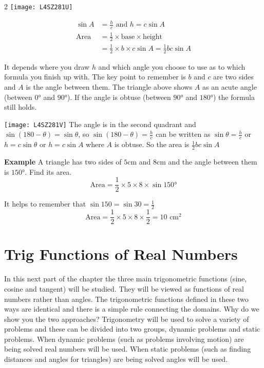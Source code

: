 \columnsep =30pt
\begin {multicols}{2} 
\texttt{[image: L4SZ281U]}

\begin{align*}\sin  A &  = \frac{h}{c}\text{ and }h =c \sin  A \\
\text{Area} &  =  \frac{1}{2} \times \text{base} \times \text{height} \\
 &  =  \frac{1}{2} \times b \times c \sin  A =\frac{1}{2} b c \sin  A
 \end{align*}
\end {multicols}
It depends where you draw $h$ and which angle you choose to use as to which formula you finish up with. The key point to remember is $b$ and $c$ are two sides and $A$ is the angle between them. The triangle above shows $A$ as an acute angle (between $\ang{0}$ and $\ang{90} $). If the angle is obtuse (between $\ang{90} $ and $\ang{180} $) the formula still holds. 
\begin{multicols}{2}
\texttt{[image: L4SZ281V]}
The angle is in the second quadrant and $\sin  (180 -\theta ) =\sin  \theta $, so $\sin  (180 -\theta ) =\frac{h}{c}$ can be written as $\sin  \theta  =\frac{h}{c}$ or $h =c \sin  \theta $ or $h =c \sin  A$ where $A$ is obtuse. So the area is $\frac{1}{2} b c \sin  A$ 
\end{multicols}
\textbf{Example} A triangle has two sides of $5 \mbox{cm}$ and $8 \mbox{cm}$ and the angle between them is $\ang{150} $. Find its area.
\begin{equation*}\text{Area} =\frac{1}{2} \times 5 \times 8 \times \sin  \ang{150} 
\end{equation*}

It helps to remember that $\sin  150 =\sin  30 =\frac{1}{2}$
\begin{equation*}\text{Area} =\frac{1}{2} \times 5 \times 8 \times \frac{1}{2} =10 \text{ cm}^{2}
\end{equation*}

\section{Trig Functions of Real Numbers}
In this next part of the chapter the three main trigonometric functions (sine, cosine and tangent) will be studied. They will be viewed as functions of real numbers rather than angles. The trigonometric functions defined in these two ways are identical and there is a simple rule connecting the domains. Why do we show you the two approaches? Trigonometry will be used to solve a variety of problems and these can be divided into two groups, dynamic problems and static problems. When dynamic problems (such as problems involving motion) are being solved real numbers will be used. When static problems (such as finding distances and angles for triangles) are being solved angles will be used. 


